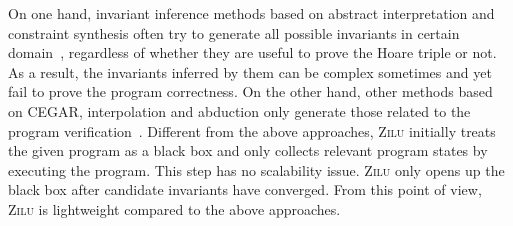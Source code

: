 On one hand, invariant inference methods based on abstract interpretation and constraint synthesis
often try to generate all possible invariants in certain domain~\cite{mine2006octagon,vincent2009subpolyhedra,ashutosh2009invgen}, regardless of
whether they are useful to prove the Hoare triple or not.
As a result, the invariants inferred by them can be complex sometimes and yet fail to prove the program correctness.
On the other hand, other methods based on CEGAR, interpolation and abduction only generate those related to the program verification~\cite{isil2013inductive}.
Different from the above approaches, \textsc{Zilu} initially treats the given program as a black box and only collects relevant program states by executing the program. 
This step has no scalability issue. 
\textsc{Zilu} only opens up the black box after candidate invariants have converged. From this point of view, \textsc{Zilu} is lightweight compared to the above approaches. 

